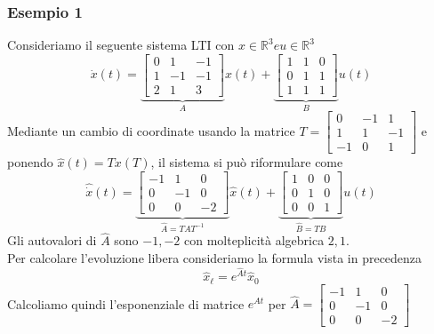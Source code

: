 \documentclass{article}
\begin{document}
\subsubsection{Esempio 1}
Consideriamo il seguente sistema LTI con $x \in \mathbb{R}^3 e u \in \mathbb{R}^3$
\[
    \dot x(t) = \underbrace{\begin{bmatrix}
        0 & 1 & -1\\
        1 & -1 & -1\\
        2 & 1 & 3 
    \end{bmatrix}}_{A} x(t) +
    \underbrace{\begin{bmatrix}
        1 & 1 & 0\\
        0 & 1 & 1\\
        1 & 1 & 1
    \end{bmatrix}}_{B} u(t)
\]
Mediante un cambio di coordinate usando la matrice $T = \begin{bmatrix}
    0 & -1 & 1\\ 1 & 1 & -1\\ -1 & 0 & 1
\end{bmatrix}$ e ponendo $\hat x(t) = T x(T)$, il sistema si può riformulare come 
\[
    \hat{\dot x} (t)= \underbrace{\begin{bmatrix}
        -1 & 1 & 0\\
        0 & -1 & 0\\
        0 & 0 & -2 
    \end{bmatrix}}_{\hat A = TAT^{-1}} \hat x(t) +
    \underbrace{\begin{bmatrix}
        1 & 0 & 0\\
        0 & 1 & 0\\
        0 & 0 & 1
    \end{bmatrix}}_{\hat B = TB} u(t)
\]
Gli autovalori di $\hat A$ sono $-1, -2$ con molteplicità algebrica $2,1$.
\vspace*{0.2cm}\\
Per calcolare l'evoluzione libera consideriamo la formula vista in precedenza
\[
    \hat x_\ell  =e^{\hat A t}\hat x_0
\]
Calcoliamo quindi l'esponenziale di matrice $e^{\hat A t}$ per $\hat A = \begin{bmatrix}
    -1 & 1 & 0\\
    0 & -1 & 0\\
    0 & 0 & -2
\end{bmatrix}$
\end{document}
